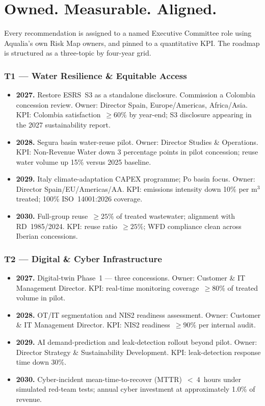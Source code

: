 \documentclass[11pt, a4paper, twoside, openright]{scrreprt}
\begin{document}
\section{Owned. Measurable. Aligned.}

Every recommendation is assigned to a named Executive Committee role using Aqualia's own Risk Map owners, and pinned to a quantitative KPI. The roadmap is structured as a three-topic by four-year grid.

\subsubsection{T1 --- Water Resilience \& Equitable Access}

\begin{itemize}
\item \textbf{2027.} Restore ESRS~S3 as a standalone disclosure. Commission a Colombia concession review. Owner: Director Spain, Europe/Americas, Africa/Asia. KPI: Colombia satisfaction~$\geq 60\%$ by year-end; S3 disclosure appearing in the 2027 sustainability report.
\item \textbf{2028.} Segura basin water-reuse pilot. Owner: Director Studies \& Operations. KPI: Non-Revenue Water down 3 percentage points in pilot concession; reuse water volume up 15\% versus 2025 baseline.
\item \textbf{2029.} Italy climate-adaptation CAPEX programme; Po basin focus. Owner: Director Spain/EU/Americas/AA. KPI: emissions intensity down 10\% per m$^3$ treated; 100\% ISO~14001:2026 coverage.
\item \textbf{2030.} Full-group reuse~$\geq 25\%$ of treated wastewater; alignment with RD~1985/2024. KPI: reuse ratio~$\geq 25\%$; WFD compliance clean across Iberian concessions.
\end{itemize}

\subsubsection{T2 --- Digital \& Cyber Infrastructure}

\begin{itemize}
\item \textbf{2027.} Digital-twin Phase~1 --- three concessions. Owner: Customer \& IT Management Director. KPI: real-time monitoring coverage~$\geq 80\%$ of treated volume in pilot.
\item \textbf{2028.} OT/IT segmentation and NIS2 readiness assessment. Owner: Customer \& IT Management Director. KPI: NIS2 readiness~$\geq 90\%$ per internal audit.
\item \textbf{2029.} AI demand-prediction and leak-detection rollout beyond pilot. Owner: Director Strategy \& Sustainability Development. KPI: leak-detection response time down 30\%.
\item \textbf{2030.} Cyber-incident mean-time-to-recover (MTTR)~$<~4$~hours under simulated red-team tests; annual cyber investment at approximately 1.0\% of revenue.
\end{itemize}
\end{document}
